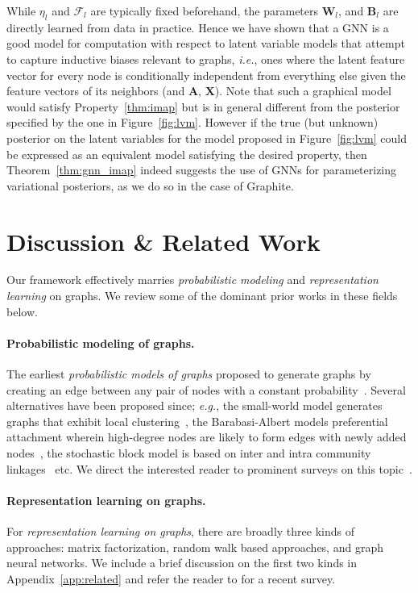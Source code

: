 \documentclass{article}
\newcommand{\name}{Graphite}
\begin{document}
While $\eta_l$ and $\mathcal{F}_l$ are typically fixed beforehand, the parameters $\mathbf{W}_l$, 
and $\mathbf{B}_l$ are directly learned from data in practice. Hence we have shown that a GNN is a good model for computation with respect to latent variable models that attempt to capture inductive biases relevant to graphs, \textit{i.e.}, ones where the latent feature vector for every node is conditionally independent from everything else given the feature vectors of its neighbors (and $\mathbf{A}$, $\mathbf{X}$). Note that such a graphical model would satisfy Property~\ref{thm:imap} but is in general different from the posterior specified by the one in Figure~\ref{fig:lvm}. However if the true (but unknown) posterior on the latent variables for the model proposed in Figure~\ref{fig:lvm} could be expressed as an equivalent model satisfying the desired property, then Theorem~\ref{thm:gnn_imap} indeed suggests the use of GNNs for parameterizing variational posteriors, as we do so in the case of \name{}.
 \section{Discussion \& Related Work}\label{sec:related}


Our framework effectively marries \textit{probabilistic modeling} and  \textit{representation learning} on graphs. We review some of the dominant prior works in these fields below.

\paragraph{Probabilistic modeling of graphs.}
The earliest \textit{probabilistic models of graphs} proposed to generate graphs by creating an edge between any pair of nodes with a constant probability~\citep{erdos1959random}. Several alternatives have been proposed since; \textit{e.g.}, the small-world model generates graphs that exhibit local clustering~\citep{watts1998collective}, the Barabasi-Albert models preferential attachment wherein high-degree nodes are likely to form edges with newly added nodes~\citep{barabasi1999random}, the stochastic block model is based on inter and intra community linkages~\citep{holland1983stochastic} etc.
 We direct the interested reader to prominent surveys on this topic~\citep{newman2003structure,mitzenmacher2004brief,chakrabarti2006graph}.

\paragraph{Representation learning on graphs.}
For \textit{representation learning on graphs}, there are broadly three kinds of approaches: matrix factorization, random walk based approaches, and graph neural networks. We include a brief discussion on the first two kinds in Appendix~\ref{app:related} and refer the reader to \citet{hamilton2017representation} for a recent survey. 
\end{document}
